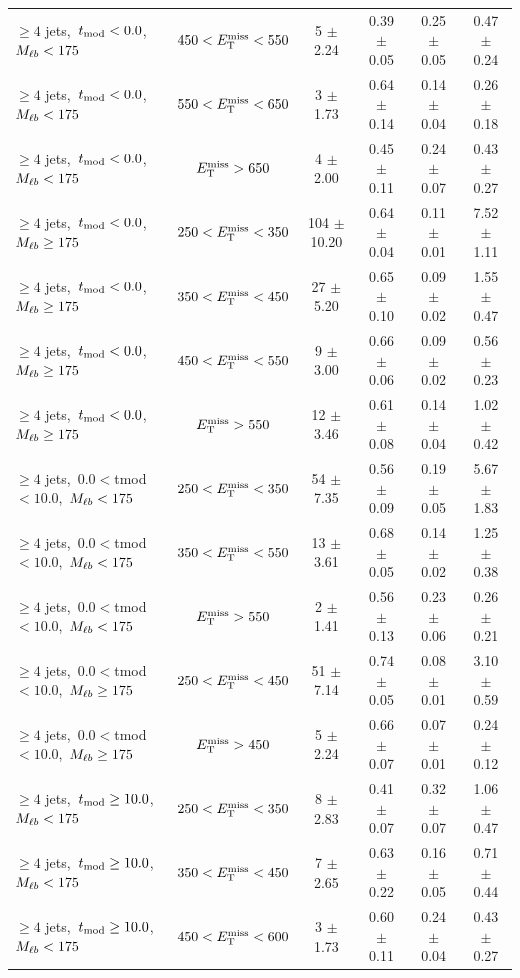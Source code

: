 \begin{table}
\begin{tabular}{|l|c|c|c|c|c|}
 $\ge4$ jets,~$t_\text{mod} <0.0$,~$M_{\ell b} <175$         & $450<E_\text{T}^\text{miss}<550$ & 5 $\pm$ 2.24    & 0.39 $\pm$ 0.05  & 0.25 $\pm$ 0.05 & 0.47 $\pm$ 0.24 \\
 $\ge4$ jets,~$t_\text{mod} <0.0$,~$M_{\ell b} <175$         & $550<E_\text{T}^\text{miss}<650$ & 3 $\pm$ 1.73    & 0.64 $\pm$ 0.14  & 0.14 $\pm$ 0.04 & 0.26 $\pm$ 0.18 \\
 $\ge4$ jets,~$t_\text{mod} <0.0$,~$M_{\ell b} <175$         & $E_\text{T}^\text{miss}>650$     & 4 $\pm$ 2.00    & 0.45 $\pm$ 0.11  & 0.24 $\pm$ 0.07 & 0.43 $\pm$ 0.27 \\
\hline
 $\ge4$ jets,~$t_\text{mod} <0.0$,~$M_{\ell b} \ge175$       & $250<E_\text{T}^\text{miss}<350$ & 104 $\pm$ 10.20 & 0.64 $\pm$ 0.04  & 0.11 $\pm$ 0.01 & 7.52 $\pm$ 1.11 \\
 $\ge4$ jets,~$t_\text{mod} <0.0$,~$M_{\ell b} \ge175$       & $350<E_\text{T}^\text{miss}<450$ & 27 $\pm$ 5.20   & 0.65 $\pm$ 0.10  & 0.09 $\pm$ 0.02 & 1.55 $\pm$ 0.47 \\
 $\ge4$ jets,~$t_\text{mod} <0.0$,~$M_{\ell b} \ge175$       & $450<E_\text{T}^\text{miss}<550$ & 9 $\pm$ 3.00    & 0.66 $\pm$ 0.06  & 0.09 $\pm$ 0.02 & 0.56 $\pm$ 0.23 \\
 $\ge4$ jets,~$t_\text{mod} <0.0$,~$M_{\ell b} \ge175$       & $E_\text{T}^\text{miss}>550$     & 12 $\pm$ 3.46   & 0.61 $\pm$ 0.08  & 0.14 $\pm$ 0.04 & 1.02 $\pm$ 0.42 \\
\hline
 $\ge4$ jets,~$0.0<$tmod$<10.0$,~$M_{\ell b} <175$  & $250<E_\text{T}^\text{miss}<350$ & 54 $\pm$ 7.35   & 0.56 $\pm$ 0.09  & 0.19 $\pm$ 0.05 & 5.67 $\pm$ 1.83 \\
 $\ge4$ jets,~$0.0<$tmod$<10.0$,~$M_{\ell b} <175$  & $350<E_\text{T}^\text{miss}<550$ & 13 $\pm$ 3.61   & 0.68 $\pm$ 0.05  & 0.14 $\pm$ 0.02 & 1.25 $\pm$ 0.38 \\
 $\ge4$ jets,~$0.0<$tmod$<10.0$,~$M_{\ell b} <175$  & $E_\text{T}^\text{miss}>550$     & 2 $\pm$ 1.41    & 0.56 $\pm$ 0.13  & 0.23 $\pm$ 0.06 & 0.26 $\pm$ 0.21 \\
\hline
 $\ge4$ jets,~$0.0<$tmod$<10.0$,~$M_{\ell b} \ge175$& $250<E_\text{T}^\text{miss}<450$ & 51 $\pm$ 7.14   & 0.74 $\pm$ 0.05  & 0.08 $\pm$ 0.01 & 3.10 $\pm$ 0.59 \\
 $\ge4$ jets,~$0.0<$tmod$<10.0$,~$M_{\ell b} \ge175$& $E_\text{T}^\text{miss}>450$     & 5 $\pm$ 2.24    & 0.66 $\pm$ 0.07  & 0.07 $\pm$ 0.01 & 0.24 $\pm$ 0.12 \\
\hline
 $\ge4$ jets,~$t_\text{mod} \ge10.0$,~$M_{\ell b} <175$      & $250<E_\text{T}^\text{miss}<350$ & 8 $\pm$ 2.83    & 0.41 $\pm$ 0.07  & 0.32 $\pm$ 0.07 & 1.06 $\pm$ 0.47 \\
 $\ge4$ jets,~$t_\text{mod} \ge10.0$,~$M_{\ell b} <175$      & $350<E_\text{T}^\text{miss}<450$ & 7 $\pm$ 2.65    & 0.63 $\pm$ 0.22  & 0.16 $\pm$ 0.05 & 0.71 $\pm$ 0.44 \\
 $\ge4$ jets,~$t_\text{mod} \ge10.0$,~$M_{\ell b} <175$      & $450<E_\text{T}^\text{miss}<600$ & 3 $\pm$ 1.73    & 0.60 $\pm$ 0.11  & 0.24 $\pm$ 0.04 & 0.43 $\pm$ 0.27 \\

\end{tabular}
\end{table}
